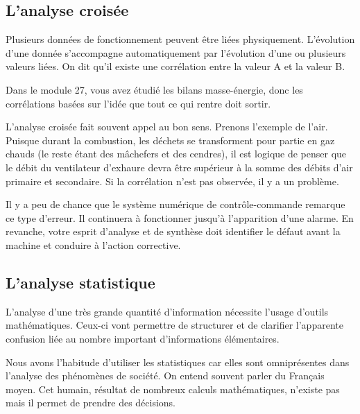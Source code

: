 \subsection{L’analyse croisée}

Plusieurs données de fonctionnement peuvent être liées physiquement. L’évolution d’une donnée s’accompagne automatiquement par l’évolution d’une ou plusieurs valeurs liées. On dit qu’il existe une corrélation entre la valeur A et la valeur B.
\vspace{0.3cm}

Dans le module 27, vous avez étudié les bilans masse-énergie, donc les corrélations basées sur l’idée que tout ce qui rentre doit sortir.
\vspace{0.3cm}

L’analyse croisée fait souvent appel au bon sens. Prenons l’exemple de l’air. Puisque durant la combustion, les déchets se transforment pour partie en gaz chauds (le reste étant des mâchefers et des cendres), il est logique de penser que le débit du ventilateur d’exhaure devra être supérieur à la somme des débits d’air primaire et secondaire. Si la corrélation n’est pas observée, il y a un problème.
\vspace{0.3cm}

Il y a peu de chance que le système numérique de contrôle-commande remarque ce type d’erreur. Il continuera à fonctionner jusqu’à l’apparition d’une alarme. En revanche, votre esprit d’analyse et de synthèse doit identifier le défaut avant la machine et conduire à l’action corrective.



 \subsection{L'analyse statistique} 
 
L’analyse d’une très grande quantité d’information nécessite l’usage d’outils mathématiques. Ceux-ci vont permettre de structurer et de clarifier l’apparente confusion liée au nombre important d’informations élémentaires.
\vspace{0.3cm}

Nous avons l’habitude d’utiliser les statistiques car elles sont omniprésentes dans l’analyse des phénomènes de société. On entend souvent parler du Français moyen. Cet humain, résultat de nombreux calculs mathématiques, n’existe pas mais il permet de prendre des décisions.
\vspace{0.3cm}

